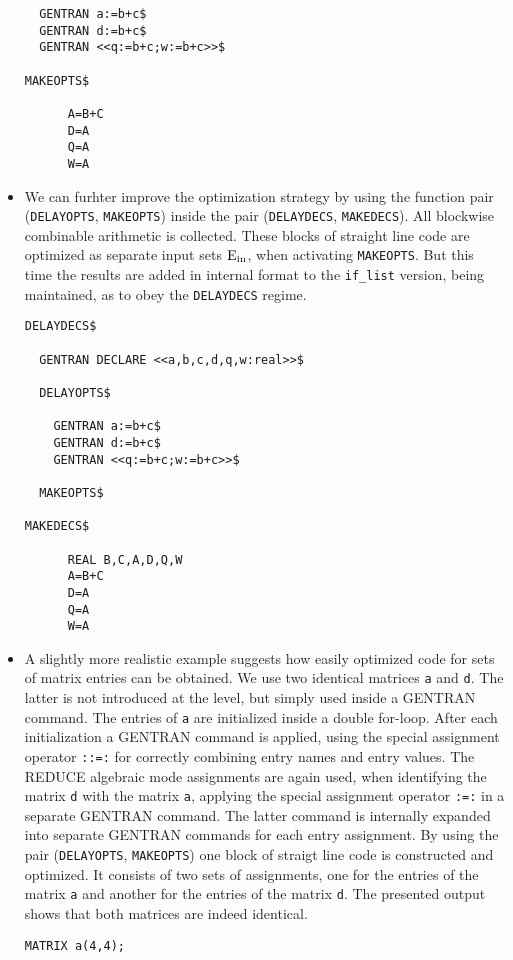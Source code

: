 \begin{itemize}
{\begin{verbatim}
  GENTRAN a:=b+c$
  GENTRAN d:=b+c$
  GENTRAN <<q:=b+c;w:=b+c>>$

MAKEOPTS$

      A=B+C
      D=A
      Q=A
      W=A
\end{verbatim}}
\item We can furhter improve the optimization strategy by using the
function pair ({\tt DELAYOPTS}, {\tt MAKEOPTS}) inside the
pair ({\tt DELAYDECS}, {\tt MAKEDECS}). All blockwise combinable arithmetic
is collected. These blocks of straight line code are optimized as separate
input sets ${\rm E_{in}}$, when activating {\tt MAKEOPTS}. But this time the
results are added in internal format to the {\tt if\_list} version,
being maintained, as to obey the {\tt DELAYDECS} regime.
{\small
\begin{verbatim}
DELAYDECS$

  GENTRAN DECLARE <<a,b,c,d,q,w:real>>$

  DELAYOPTS$

    GENTRAN a:=b+c$
    GENTRAN d:=b+c$
    GENTRAN <<q:=b+c;w:=b+c>>$

  MAKEOPTS$

MAKEDECS$

      REAL B,C,A,D,Q,W
      A=B+C
      D=A
      Q=A
      W=A
\end{verbatim}}
\item A slightly more realistic example suggests how easily optimized code
for sets of matrix entries can be obtained. We use two identical matrices
{\tt a} and {\tt d}. The latter is not introduced at the {\REDUCE} level,
but simply used inside a GENTRAN command. The entries of {\tt a} are
initialized inside a double for-loop. After each initialization a GENTRAN
command is applied, using the special assignment operator {\tt ::=:} for
correctly combining entry names and entry values. The REDUCE algebraic mode
assignments are again used, when identifying the matrix {\tt d} with the
matrix {\tt a}, applying the special assignment operator {\tt :=:} in a
separate GENTRAN command. The latter command is internally expanded into
separate GENTRAN commands for each entry assignment. By using the pair
({\tt DELAYOPTS}, {\tt MAKEOPTS}) one block of straigt line code is
constructed and optimized. It consists of two sets of assignments, one
for the entries of the matrix {\tt a} and another for the entries of the
matrix {\tt d}. The presented output shows that both matrices are indeed
identical.
{\small
\begin{verbatim}
MATRIX a(4,4);


\end{verbatim}}
\end{itemize}
